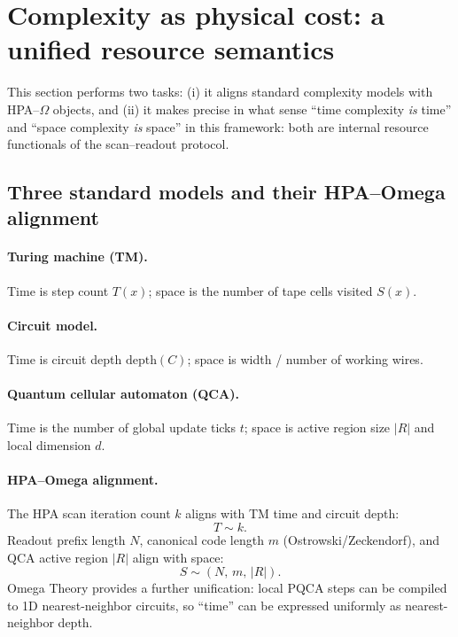 \section{Complexity as physical cost: a unified resource semantics}
\label{sec:complexity}

This section performs two tasks: (i) it aligns standard complexity models with HPA--$\Omega$ objects, and (ii) it makes precise in what sense ``time complexity \emph{is} time'' and ``space complexity \emph{is} space'' in this framework: both are internal resource functionals of the scan--readout protocol.

\subsection{Three standard models and their HPA--Omega alignment}
\label{subsec:model_alignment}

\paragraph{Turing machine (TM).}
Time is step count $T(x)$; space is the number of tape cells visited $S(x)$.

\paragraph{Circuit model.}
Time is circuit depth $\mathrm{depth}(C)$; space is width / number of working wires.

\paragraph{Quantum cellular automaton (QCA).}
Time is the number of global update ticks $t$; space is active region size $|R|$ and local dimension $d$.

\paragraph{HPA--Omega alignment.}
The HPA scan iteration count $k$ aligns with TM time and circuit depth:
\begin{equation}
T \sim k.
\end{equation}
Readout prefix length $N$, canonical code length $m$ (Ostrowski/Zeckendorf), and QCA active region $|R|$ align with space:
\begin{equation}
S \sim (N,\,m,\,|R|).
\end{equation}
Omega Theory provides a further unification: local PQCA steps can be compiled to 1D nearest-neighbor circuits, so ``time'' can be expressed uniformly as nearest-neighbor depth.

